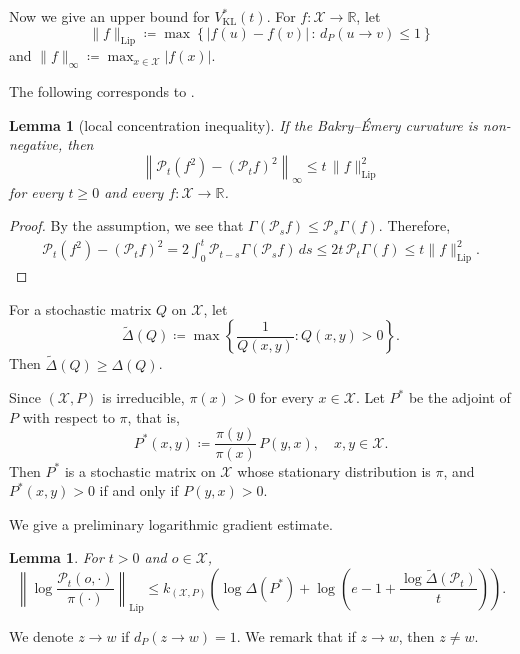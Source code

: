 \documentclass[a4paper, reqno, 11pt]{amsart}
\newtheorem{Lem}[Thm]{Lemma}
\theoremstyle{definition}
\begin{document}
Now we give an upper bound for $V_{\mathrm{KL}}^{*} (t)$. 
For $f \colon \mathcal{X}\to\mathbb{R}$, let 
\[ \|f\|_{\mathrm{Lip}} \coloneqq \max\left\{|f(u)-f(v)| \,\colon\, d_P (u \to v) \le 1\right\} \]
and $\|f \|_{\infty} \coloneqq \max_{x \in \mathcal{X}} |f(x)|$. 


The following corresponds to \cite[Lemma 9]{Salez2024}. 

\begin{Lem}[local concentration inequality]\label{lem:semigroup}
If the Bakry--\'Emery curvature is non-negative, then 
\[ \left\|\mathscr{P}_{t}(f^2)-(\mathscr{P}_{t} f)^2\right\|_{\infty} \le t\,\|f\|_{\mathrm{Lip}}^2\]
for every $t \ge 0$ and every  $f \colon \mathcal{X} \to \mathbb{R}$.
\end{Lem}

\begin{proof}
By the assumption, we see that $\Gamma(\mathcal P_s f)\le \mathcal P_s\Gamma(f)$. 
Therefore, 
\begin{align*}
\mathcal P_t(f^2)-(\mathcal P_t f)^2 = 2\int_0^t \mathcal P_{t-s}\Gamma(\mathcal P_s f)\,ds \le 2t\,\mathcal P_t\Gamma(f) \le t\|f\|_{\mathrm{Lip}}^2.
\end{align*}
\end{proof}


For a stochastic matrix $Q$ on $\mathcal{X}$, let  
\[ \widetilde{\Delta}(Q) \coloneqq \max\left\{\frac{1}{Q(x,y)} \colon Q(x,y)>0\right\}. \]
Then $\widetilde{\Delta}(Q) \ge \Delta(Q)$.

Since $(\mathcal{X}, P)$ is irreducible, $\pi(x) > 0$ for every $x \in \mathcal{X}$.
Let $P^{*}$ be the adjoint of $P$ with respect to $\pi$, that is,
\[ P^{*}(x,y) \coloneqq \frac{\pi(y)}{\pi(x)}\,P(y,x), \quad x, y \in \mathcal{X}. \]
Then $P^{*}$ is a stochastic matrix on $\mathcal{X}$ whose stationary distribution is $\pi$,
and $P^{*}(x,y) > 0$ if and only if $P(y,x) > 0$.


We give a preliminary logarithmic gradient estimate. 

\begin{Lem}\label{lem:log-Pt-Lip}
For $t > 0$ and $o \in \mathcal{X}$,
\[ \left\|\log \frac{\mathscr{P}_t (o, \cdot)}{\pi(\cdot)}\right\|_{\mathrm{Lip}}
\le k_{(\mathcal{X}, P)}\left( \log \Delta(P^*)  + \log\left(e-1+\frac{\log \widetilde{\Delta}(\mathscr{P}_t)}{t}\right) \right). \]
\end{Lem}


We denote $z \to w$ if $d_P (z \to w) = 1$. 
We remark that if $z \to w$, then $z \ne w$. 
\end{document}

